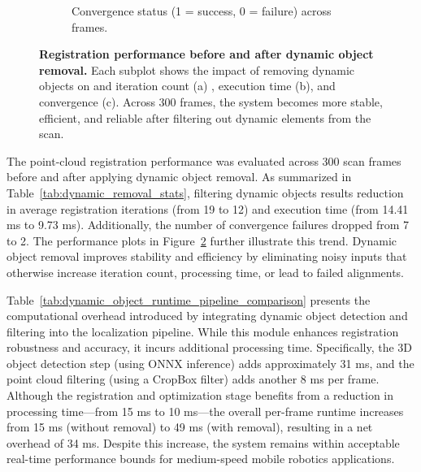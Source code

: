\begin{figure}[H]
\begin{subfigure}[t]{0.45\textwidth}
		 \caption{Convergence status (1 = success, 0 = failure) across frames.}
		\label{fig:reg_converge}
	\end{subfigure}
	\caption[Point-cloud Registration Performance with and without Dynamic Object Removal]{\textbf{Registration performance before and after dynamic object removal.} Each subplot shows the impact of removing dynamic objects on and iteration count (a) , execution time (b), and convergence (c). Across 300 frames, the system becomes more stable, efficient, and reliable after filtering out dynamic elements from the scan.}
	\label{fig:registration_metrics_comparison}
\end{figure}

The point-cloud registration performance was evaluated across 300 scan frames before and after applying dynamic object removal. As summarized in Table~\ref{tab:dynamic_removal_stats}, filtering dynamic objects results  reduction in average registration iterations (from 19 to 12) and execution time (from 14.41 ms to 9.73 ms). Additionally, the number of convergence failures dropped from 7 to 2. The performance plots in Figure~\ref{fig:registration_metrics_comparison} further illustrate this trend. Dynamic object removal improves stability and efficiency by eliminating noisy inputs that otherwise increase iteration count, processing time, or lead to failed alignments.


Table~\ref{tab:dynamic_object_runtime_pipeline_comparison} presents the computational overhead introduced by integrating dynamic object detection and filtering into the localization pipeline. While this module enhances registration robustness and accuracy, it incurs additional processing time. Specifically, the 3D object detection step (using ONNX inference) adds approximately 31 ms, and the point cloud filtering (using a CropBox filter) adds another 8 ms per frame. Although the registration and optimization stage benefits from a reduction in processing time—from 15 ms to 10 ms—the overall per-frame runtime increases from 15 ms (without removal) to 49 ms (with removal), resulting in a net overhead of 34 ms. Despite this increase, the system remains within acceptable real-time performance bounds for medium-speed mobile robotics applications.


